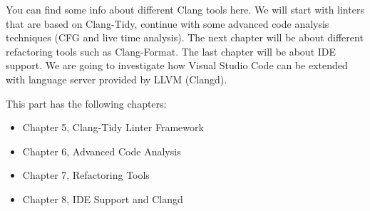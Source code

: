 You can find some info about different Clang tools here. We will start with linters that are based on Clang-Tidy, continue with some advanced code analysis techniques (CFG and live time analysis). The next chapter will be about different refactoring tools such as Clang-Format. The last chapter will be about IDE support. We are going to investigate how Visual Studio Code can be extended with language server provided by LLVM (Clangd).

This part has the following chapters:

\begin{itemize}
\item
Chapter 5, Clang-Tidy Linter Framework

\item
Chapter 6, Advanced Code Analysis

\item
Chapter 7, Refactoring Tools

\item
Chapter 8, IDE Support and Clangd
\end{itemize}
